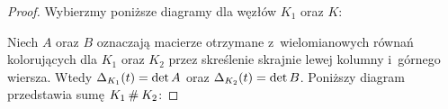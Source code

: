 \begin{proof}
    Wybierzmy poniższe diagramy dla węzłów $K_1$ oraz $K$:
\begin{comment}
    \[\begin{tikzpicture}[baseline=-0.65ex, scale=0.07]
    \begin{knot}[clip width=5, end tolerance=1pt]
        \strand[semithick] (-70, -10) rectangle (-30, 10);
        \strand[semithick] ( 30, -10) rectangle ( 70, 10);
        \strand[semithick,Latex-] (-30, 5) .. controls (-22, 5) and (-18, -5) .. (-10, -5);
        \strand[semithick] (-30,-5) .. controls (-22, -5) and (-18, 5) .. (-10,  5);
        \strand[semithick] (-10, 5) [in=up, out=right] to (-5, 0) [in=right, out=down] to (-10, -5);

        \strand[semithick,-Latex] (30, 5) .. controls (22, 5) and (18, -5) .. (10, -5);
        \strand[semithick] (30,-5) .. controls (22, -5) and (18, 5) .. (10,  5);
        \strand[semithick] (10, 5) [in=up, out=left] to (5, 0) [in=left, out=down] to (10, -5);

        \node[darkblue] at (-50,5) {$x_1,\ldots,x_{m-1}$};
        \node[red] at (-50,-5) {$1,\ldots,m$};

        \node[darkblue] at (50,5) {$y_1,\ldots,y_{n-1}$};
        \node[red] at (50,-5) {$1,\ldots,n$};

        \node[darkblue] at (-30,-5)[below right] {$x_m$};
        \node[darkblue] at (-15,-5)[below] {$x_0$};
        \node[darkblue] at (30,-5)[below left] {$y_n$};
        \node[darkblue] at (15,-5)[below] {$y_0$};
        \node[red] at ( 19.5,  1)[above]{$0$};
        \node[red] at (-19.5,  1)[above]{$0$};
    \end{knot}
    \end{tikzpicture}
\]
\end{comment}
    Niech $A$ oraz $B$ oznaczają macierze otrzymane z~wielomianowych równań kolorujących dla $K_1$ oraz $K_2$ przez skreślenie skrajnie lewej kolumny i~górnego wiersza.
    Wtedy $\Delta_{K_1}(t) = \det A$ oraz $\Delta_{K_2}(t) = \det B$.
    Poniższy diagram przedstawia sumę $K_1 \mathbin{\#} K_2$:

\begin{comment}
\[\begin{tikzpicture}[baseline=-0.65ex, scale=0.07]
    \begin{knot}[clip width=5, end tolerance=1pt]
        \strand[semithick] (-70, -10) rectangle (-30, 10);
        \strand[semithick] ( 30, -10) rectangle ( 70, 10);
        \strand[semithick,Latex-] (-30, 5) .. controls (-22, 5) and (-18, -5) .. (-10, -5);
        \strand[semithick] (-30,-5) .. controls (-22, -5) and (-18, 5) .. (-10,  5);


\end{comment}
\end{proof}
